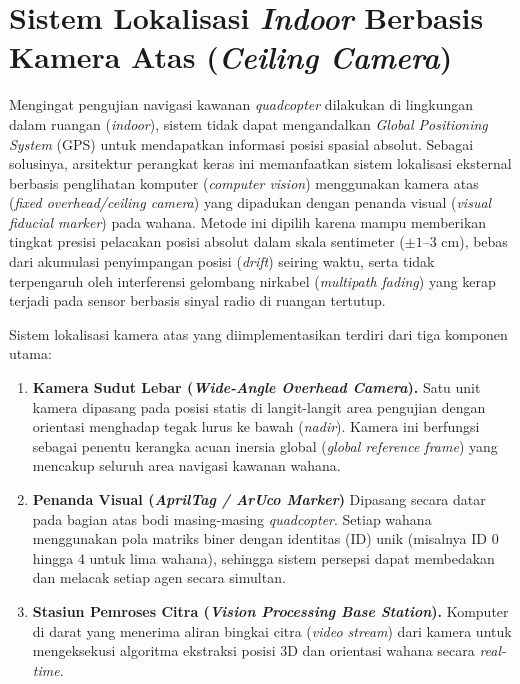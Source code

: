 \documentclass[12pt,a4paper]{report}
\numberwithin{equation}{chapter}
\begin{document}
\section{Sistem Lokalisasi \textit{Indoor} Berbasis Kamera Atas (\textit{Ceiling Camera})}

Mengingat pengujian navigasi kawanan \textit{quadcopter} dilakukan di lingkungan dalam ruangan (\textit{indoor}), sistem tidak dapat mengandalkan \textit{Global Positioning System} (GPS) untuk mendapatkan informasi posisi spasial absolut.
Sebagai solusinya, arsitektur perangkat keras ini memanfaatkan sistem lokalisasi eksternal berbasis penglihatan komputer (\textit{computer vision}) menggunakan kamera atas (\textit{fixed overhead/ceiling camera}) yang dipadukan dengan penanda visual (\textit{visual fiducial marker}) pada wahana.
Metode ini dipilih karena mampu memberikan tingkat presisi pelacakan posisi absolut dalam skala sentimeter ($\pm 1\text{--}3\text{ cm}$), bebas dari akumulasi penyimpangan posisi (\textit{drift}) seiring waktu, serta tidak terpengaruh oleh interferensi gelombang nirkabel (\textit{multipath fading}) yang kerap terjadi pada sensor berbasis sinyal radio di ruangan tertutup.

Sistem lokalisasi kamera atas yang diimplementasikan terdiri dari tiga komponen utama:
\begin{enumerate}
    \item \textbf{Kamera Sudut Lebar (\textit{Wide-Angle Overhead Camera}).} Satu unit kamera dipasang pada posisi statis di langit-langit area pengujian dengan orientasi menghadap tegak lurus ke bawah (\textit{nadir}). Kamera ini berfungsi sebagai penentu kerangka acuan inersia global (\textit{global reference frame}) yang mencakup seluruh area navigasi kawanan wahana.
    \item \textbf{Penanda Visual (\textit{AprilTag / ArUco Marker})} Dipasang secara datar pada bagian atas bodi masing-masing \textit{quadcopter}. Setiap wahana menggunakan pola matriks biner dengan identitas (ID) unik (misalnya ID 0 hingga 4 untuk lima wahana), sehingga sistem persepsi dapat membedakan dan melacak setiap agen secara simultan.
    \item \textbf{Stasiun Pemroses Citra (\textit{Vision Processing Base Station}).} Komputer di darat yang menerima aliran bingkai citra (\textit{video stream}) dari kamera untuk mengeksekusi algoritma ekstraksi posisi 3D dan orientasi wahana secara \textit{real-time}.
\end{enumerate}
\end{document}
